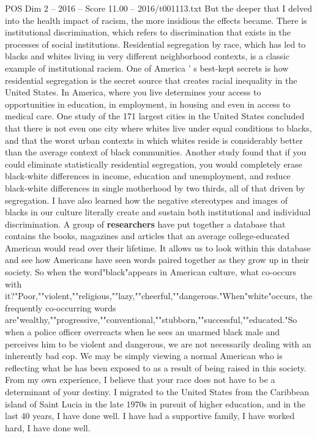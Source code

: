 \begin{textsample}{POS Dim 2 – 2016 – Score 11.00 – 2016/t001113.txt}
But the deeper that I delved into the health impact of racism, the more insidious the effects became.
There is institutional discrimination, which refers to discrimination that exists in the processes of social institutions.
Residential segregation by race, which has led to blacks and whites living in very different neighborhood contexts, is a classic example of institutional racism.
One of America ' s best-kept secrets is how residential segregation is the secret source that creates racial inequality in the United States.
In America, where you live determines your access to opportunities in education, in employment, in housing and even in access to medical care.
One study of the 171 largest cities in the United States concluded that there is not even one city where whites live under equal conditions to blacks, and that the worst urban contexts in which whites reside is considerably better than the average context of black communities.
Another study found that if you could eliminate statistically residential segregation, you would completely erase black-white differences in income, education and unemployment, and reduce black-white differences in single motherhood by two thirds, all of that driven by segregation.
I have also learned how the negative stereotypes and images of blacks in our culture literally create and sustain both institutional and individual discrimination.
A group of \textbf{researchers} have put together a database that contains the books, magazines and articles that an average college-educated American would read over their lifetime.
It allows us to look within this database and see how Americans have seen words paired together as they grow up in their society.
So when the word"black"appears in American culture, what co-occurs with it?"Poor,""violent,""religious,""lazy,""cheerful,""dangerous."When"white"occurs, the frequently co-occurring words are"wealthy,""progressive,""conventional,""stubborn,""successful,""educated."So when a police officer overreacts when he sees an unarmed black male and perceives him to be violent and dangerous, we are not necessarily dealing with an inherently bad cop.
We may be simply viewing a normal American who is reflecting what he has been exposed to as a result of being raised in this society.
From my own experience, I believe that your race does not have to be a determinant of your destiny.
I migrated to the United States from the Caribbean island of Saint Lucia in the late 1970s in pursuit of higher education, and in the last 40 years, I have done well.
I have had a supportive family, I have worked hard, I have done well.

\end{textsample}
